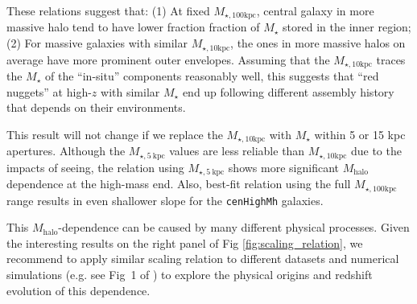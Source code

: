 \documentclass[a4paper,fleqn,usenatbib]{mnras}
\def\redm{\texttt{redMaPPer}}
\def\rbcg{\texttt{cenHighMh}}
\def\mstar{{$M_{\star}$}}
\def\mhalo{{$M_{\mathrm{halo}}$}}
\def\minn{{$M_{\star,10\mathrm{kpc}}$}}
\def\mtot{{$M_{\star,100\mathrm{kpc}}$}}
\begin{document}
    These relations suggest that: (1) At fixed \mtot{}, central galaxy in more 
    massive halo tend to have lower fraction fraction of \mstar{} stored in the inner
    region; (2) For massive galaxies with similar \minn{}, the ones in more 
    massive halos on average have more prominent outer envelopes.  
    Assuming that the \minn{} traces the \mstar{} of the ``in-situ'' components 
    reasonably well, this suggests that ``red nuggets'' at high-$z$ with similar 
    \mstar{} end up following different assembly history that depends on their 
    environments. 
        
    This result will not change if we replace the \minn{} with \mstar{} within 5 or 
    15 kpc apertures.
    Although the $M_{\star, 5\ \mathrm{kpc}}$ values are less reliable than \minn{} 
    due to the impacts of seeing, the relation using $M_{\star, 5\ \mathrm{kpc}}$ shows 
    more significant \mhalo{} dependence at the high-mass end.
    Also, best-fit relation using the full \mtot{} range results in even shallower 
    slope for the \rbcg{} galaxies.          
    
   
    This \mhalo{}-dependence can be caused by many different physical processes. 
    Given the interesting results on the right panel of Fig \ref{fig:scaling_relation},
    we recommend to apply similar scaling relation to different datasets and 
    numerical simulations (e.g. see Fig~1 of \citealt{Wellons2016b}) to explore the 
    physical origins and redshift evolution of this dependence. 

\end{document}

